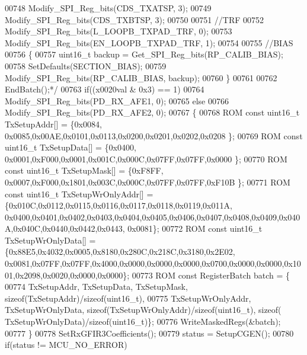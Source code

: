 \begin{DoxyCode}
{{{{{{{{{{{{{{{{00748 \textcolor{comment}{    Modify\_SPI\_Reg\_bits(CDS\_TXATSP, 3);}
00749 \textcolor{comment}{    Modify\_SPI\_Reg\_bits(CDS\_TXBTSP, 3);}
00750 \textcolor{comment}{}
00751 \textcolor{comment}{    //TRF}
00752 \textcolor{comment}{    Modify\_SPI\_Reg\_bits(L\_LOOPB\_TXPAD\_TRF, 0);}
00753 \textcolor{comment}{    Modify\_SPI\_Reg\_bits(EN\_LOOPB\_TXPAD\_TRF, 1);}
00754 \textcolor{comment}{}
00755 \textcolor{comment}{    //BIAS}
00756 \textcolor{comment}{    \{}
00757 \textcolor{comment}{        uint16\_t backup = Get\_SPI\_Reg\_bits(RP\_CALIB\_BIAS);}
00758 \textcolor{comment}{        SetDefaults(SECTION\_BIAS);}
00759 \textcolor{comment}{        Modify\_SPI\_Reg\_bits(RP\_CALIB\_BIAS, backup);}
00760 \textcolor{comment}{    \}}
00761 \textcolor{comment}{}
00762 \textcolor{comment}{    EndBatch();*/}
00763     \textcolor{keywordflow}{if}((x0020val & 0x3) == 1)
00764         Modify_SPI_Reg_bits(PD_RX_AFE1, 0);
00765     \textcolor{keywordflow}{else}
00766         Modify_SPI_Reg_bits(PD_RX_AFE2, 0);
00767     \{
00768         ROM \textcolor{keyword}{const} uint16\_t TxSetupAddr[] = \{0x0084, 0x0085,0x00AE,0x0101,0x0113,0x0200,0x0201,0x0202,0x0208
      \};
00769         ROM \textcolor{keyword}{const} uint16\_t TxSetupData[] = \{0x0400, 0x0001,0xF000,0x0001,0x001C,0x000C,0x07FF,0x07FF,0x0000
      \};
00770         ROM \textcolor{keyword}{const} uint16\_t TxSetupMask[] = \{0xF8FF, 0x0007,0xF000,0x1801,0x003C,0x000C,0x07FF,0x07FF,0xF10B
      \};
00771         ROM \textcolor{keyword}{const} uint16\_t TxSetupWrOnlyAddr[] = \{0x010C,0x0112,0x0115,0x0116,0x0117,0x0118,0x0119,0x011A,
      0x0400,0x0401,0x0402,0x0403,0x0404,0x0405,0x0406,0x0407,0x0408,0x0409,0x040A,0x040C,0x0440,0x0442,0x0443, 
      0x0081\};
00772         ROM \textcolor{keyword}{const} uint16\_t TxSetupWrOnlyData[] = \{0x88E5,0x4032,0x0005,0x8180,0x280C,0x218C,0x3180,0x2E02,
      0x0081,0x07FF,0x07FF,0x4000,0x0000,0x0000,0x0000,0x0700,0x0000,0x0000,0x1001,0x2098,0x0020,0x0000,0x0000\};
00773         ROM \textcolor{keyword}{const} RegisterBatch batch = \{
00774             TxSetupAddr, TxSetupData, TxSetupMask, \textcolor{keyword}{sizeof}(TxSetupAddr)/\textcolor{keyword}{sizeof}(uint16\_t),
00775             TxSetupWrOnlyAddr, TxSetupWrOnlyData, \textcolor{keyword}{sizeof}(TxSetupWrOnlyAddr)/\textcolor{keyword}{sizeof}(uint16\_t), \textcolor{keyword}{sizeof}(
      TxSetupWrOnlyData)/\textcolor{keyword}{sizeof}(uint16\_t)\};
00776         WriteMaskedRegs(&batch);
00777     \}
00778     SetRxGFIR3Coefficients();
00779     status = SetupCGEN();
00780     \textcolor{keywordflow}{if}(status != MCU_NO_ERROR)
}}}}}}}}}}}}}}}}
\end{DoxyCode}
